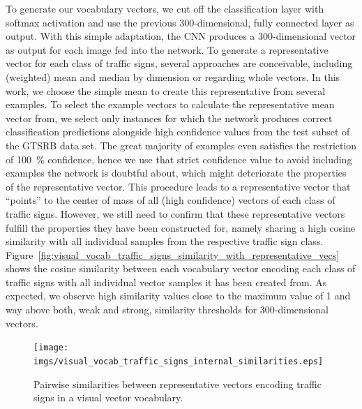 To generate our vocabulary vectors, we cut off the classification layer with softmax activation and use the previous \num{300}-dimensional, fully connected layer as output.
With this simple adaptation, the \ac{CNN} produces a \num{300}-dimensional vector as output for each image fed into the network. 
To generate a representative vector for each class of traffic signs, several approaches are conceivable, including (weighted) mean and median by dimension or regarding whole vectors.
In this work, we choose the simple mean to create this representative from several examples.
To select the example vectors to calculate the representative mean vector from, we select only instances for which the network produces correct classification predictions alongside high confidence values from the test subset of the \ac{GTSRB} data set.
The great majority of examples even satisfies the restriction of \SI{100}{\percent} confidence, hence we use that strict confidence value to avoid including examples the network is doubtful about, which might deteriorate the properties of the representative vector. 
This procedure leads to a representative vector that \enquote{points} to the center of mass of all (high confidence) vectors of each class of traffic signs.
However, we still need to confirm that these representative vectors fulfill the properties they have been constructed for, namely sharing a high cosine similarity with all individual samples from the respective traffic sign class.
Figure~\ref{fig:visual_vocab_traffic_signs_similarity_with_representative_vecs} shows the cosine similarity between each vocabulary vector encoding each class of traffic signs with all individual vector samples it has been created from.
As expected, we observe high similarity values close to the maximum value of \num{1} and way above both, weak and strong, similarity thresholds for \num{300}-dimensional vectors.

\begin{figure}[t]
    \centering
    \texttt{[image: imgs/visual\_vocab\_traffic\_signs\_internal\_similarities.eps]}
    \caption{Pairwise similarities between representative vectors encoding traffic signs in a visual vector vocabulary.}
    \label{fig:visual_vocab_traffic_signs_internal_similarities}
\end{figure}

